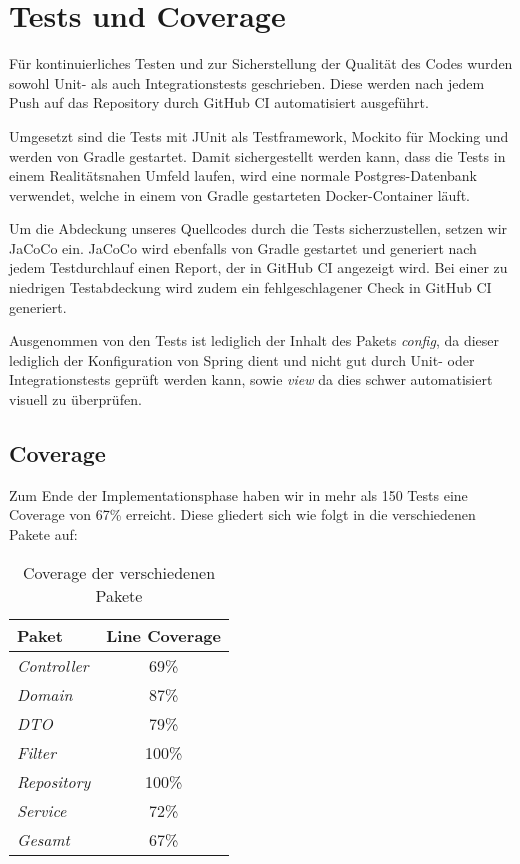 
\chapter{Tests und Coverage}
\label{ch:tests}

Für kontinuierliches Testen und zur Sicherstellung der Qualität des Codes wurden sowohl Unit- als auch Integrationstests geschrieben.
Diese werden nach jedem Push auf das Repository durch GitHub CI automatisiert ausgeführt.

Umgesetzt sind die Tests mit JUnit als Testframework, Mockito für Mocking und werden von Gradle gestartet.
Damit sichergestellt werden kann, dass die Tests in einem Realitätsnahen Umfeld laufen,
wird eine normale Postgres-Datenbank verwendet, welche in einem von Gradle gestarteten Docker-Container läuft.

Um die Abdeckung unseres Quellcodes durch die Tests sicherzustellen, setzen wir JaCoCo ein.
JaCoCo wird ebenfalls von Gradle gestartet und generiert nach jedem Testdurchlauf einen Report, der in GitHub CI angezeigt wird.
Bei einer zu niedrigen Testabdeckung wird zudem ein fehlgeschlagener Check in GitHub CI generiert.

Ausgenommen von den Tests ist lediglich der Inhalt des Pakets \textit{config},
da dieser lediglich der Konfiguration von Spring dient und nicht gut durch Unit- oder Integrationstests geprüft werden kann, sowie \textit{view} da dies schwer automatisiert visuell zu überprüfen.

\newpage

\section{Coverage}\label{sec:coverage}

Zum Ende der Implementationsphase haben wir in mehr als 150 Tests eine Coverage von 67\% erreicht.
Diese gliedert sich wie folgt in die verschiedenen Pakete auf:

\begin{table}[h]
    \centering
    \renewcommand{\arraystretch}{1.3}
    \begin{tabular}{l|c}
        \textbf{Paket} & \textbf{Line Coverage} \\
        \hline
        \hline
        \textit{Controller}  & 69\% \\
        \textit{Domain}      & 87\% \\
        \textit{DTO}         & 79\% \\
        \textit{Filter}      & 100\% \\
        \textit{Repository}  & 100\% \\
        \textit{Service}     & 72\% \\
        \hline
        \textit{Gesamt}      & 67\% \\
    \end{tabular}
    \caption{Coverage der verschiedenen Pakete}
    \label{tab:progress}
\end{table}
